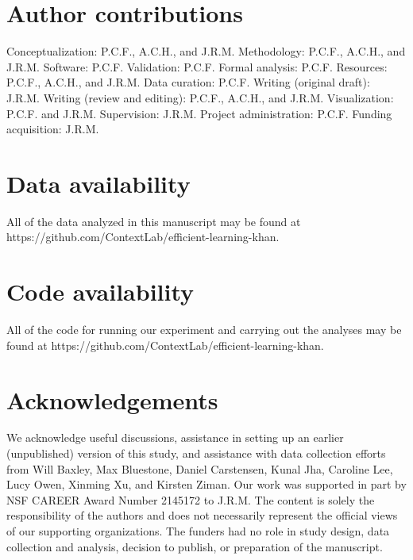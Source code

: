 \documentclass[10pt]{article}
\begin{document}
\section*{Author contributions}

Conceptualization: P.C.F., A.C.H., and J.R.M. Methodology: P.C.F., A.C.H., and
J.R.M. Software: P.C.F. Validation: P.C.F. Formal analysis: P.C.F. Resources: P.C.F.,
A.C.H., and J.R.M. Data curation: P.C.F. Writing (original draft): J.R.M. Writing
(review and editing): P.C.F., A.C.H., and J.R.M. Visualization: P.C.F. and J.R.M.
Supervision: J.R.M. Project administration: P.C.F. Funding acquisition: J.R.M.


\section*{Data availability}

All of the data analyzed in this manuscript may be found at
https://github.com/Con\-text\-Lab/eff\-ic\-ient-learn\-ing-khan.

\section*{Code availability}

All of the code for running our experiment and carrying out the analyses may be
found at https://github.com/Con\-text\-Lab/eff\-ic\-ient-learn\-ing-khan.

\section*{Acknowledgements}

We acknowledge useful discussions, assistance in setting up an earlier
(unpublished) version of this study, and assistance with data collection
efforts from Will Baxley, Max Bluestone, Daniel Carstensen, Kunal Jha, Caroline
Lee, Lucy Owen, Xinming Xu, and Kirsten Ziman. Our work was supported in part
by NSF CAREER Award Number 2145172 to J.R.M. The content is solely the
responsibility of the authors and does not necessarily represent the official
views of our supporting organizations. The funders had no role in study design,
data collection and analysis, decision to publish, or preparation of the
manuscript.





\end{document}
